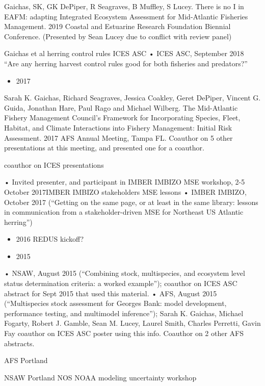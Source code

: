 \documentclass[11pt, a4paper]{awesome-cv}
\providecommand{\tightlist}{%
	\setlength{\itemsep}{0pt}\setlength{\parskip}{0pt}}
\begin{document}
Gaichas, SK, GK DePiper, R Seagraves, B Muffley, S Lucey. There is no I
in EAFM: adapting Integrated Ecosystem Assessment for Mid-Atlantic
Fisheries Management. 2019 Coastal and Estuarine Research Foundation
Biennial Conference. (Presented by Sean Lucey due to conflict with
review panel)

Gaichas et al herring control rules ICES ASC • ICES ASC, September 2018
``Are any herring harvest control rules good for both fisheries and
predators?''

\begin{itemize}
\tightlist
\item
  2017
\end{itemize}

Sarah K. Gaichas, Richard Seagraves, Jessica Coakley, Geret DePiper,
Vincent G. Guida, Jonathan Hare, Paul Rago and Michael Wilberg. The
Mid-Atlantic Fishery Management Council's Framework for Incorporating
Species, Fleet, Habitat, and Climate Interactions into Fishery
Management: Initial Risk Assessment. 2017 AFS Annual Meeting, Tampa FL.
Coauthor on 5 other presentations at this meeting, and presented one for
a coauthor.

coauthor on ICES presentations

• Invited presenter, and participant in IMBER IMBIZO MSE workshop, 2-5
October 2017IMBER IMBIZO stakeholders MSE lessons • IMBER IMBIZO,
October 2017 (``Getting on the same page, or at least in the same
library: lessons in communication from a stakeholder-driven MSE for
Northeast US Atlantic herring'')

\begin{itemize}
\item
  2016 REDUS kickoff?
\item
  2015
\end{itemize}

• NSAW, August 2015 (``Combining stock, multispecies, and ecosystem
level status determination criteria: a worked example''); coauthor on
ICES ASC abstract for Sept 2015 that used this material. • AFS, August
2015 (``Multispecies stock assessment for Georges Bank: model
development, performance testing, and multimodel inference''); Sarah K.
Gaichas, Michael Fogarty, Robert J. Gamble, Sean M. Lucey, Laurel Smith,
Charles Perretti, Gavin Fay coauthor on ICES ASC poster using this info.
Coauthor on 2 other AFS abstracts.

AFS Portland

NSAW Portland NOS NOAA modeling uncertainty workshop
\end{document}
